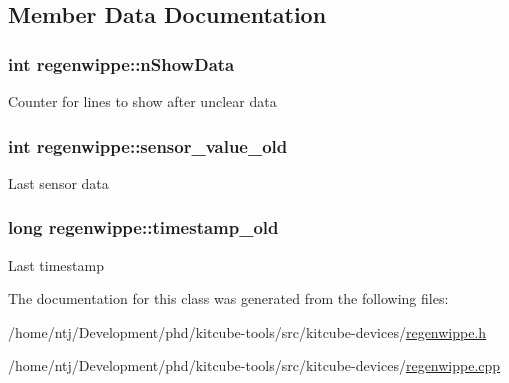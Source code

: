 \subsection{Member Data Documentation}
\hypertarget{classregenwippe_ad36d8ccd489e7f1f9599bd7edac671c4}{
\subsubsection[{n\-Show\-Data}]{\setlength{\rightskip}{0pt plus 5cm}int regenwippe\-::n\-Show\-Data\hspace{0.3cm}{\ttfamily [private]}}}\label{classregenwippe_ad36d8ccd489e7f1f9599bd7edac671c4}
Counter for lines to show after unclear data \hypertarget{classregenwippe_a36f67a6719525a1196e7ba2a3039c116}{
\subsubsection[{sensor\-\_\-value\-\_\-old}]{\setlength{\rightskip}{0pt plus 5cm}int regenwippe\-::sensor\-\_\-value\-\_\-old\hspace{0.3cm}{\ttfamily [private]}}}\label{classregenwippe_a36f67a6719525a1196e7ba2a3039c116}
Last sensor data \hypertarget{classregenwippe_aae07dc7dee8d390b563878aba636a047}{
\subsubsection[{timestamp\-\_\-old}]{\setlength{\rightskip}{0pt plus 5cm}long regenwippe\-::timestamp\-\_\-old\hspace{0.3cm}{\ttfamily [private]}}}\label{classregenwippe_aae07dc7dee8d390b563878aba636a047}
Last timestamp 

The documentation for this class was generated from the following files\-:\begin{DoxyCompactItemize}
\item 
/home/ntj/\-Development/phd/kitcube-\/tools/src/kitcube-\/devices/\hyperlink{regenwippe_8h}{regenwippe.\-h}\item 
/home/ntj/\-Development/phd/kitcube-\/tools/src/kitcube-\/devices/\hyperlink{regenwippe_8cpp}{regenwippe.\-cpp}\end{DoxyCompactItemize}
